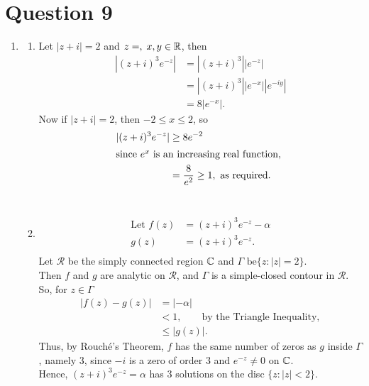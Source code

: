 \section{Question 9}
\begin{enumerate}[label=(\alph*)]
    \item 
    \begin{enumerate}[label=(\roman*)]
        \item 
        Let $ |z+i| = 2 $ and $ z = , \; x, y \in \mathbb{R} $, then
        \begin{align*}
            |(z+i)^3 e^{-z}| &= |(z+i)^3| |e^{-z}| \\
            &= |(z+i)^3| |e^{-x}|| e^{-iy} | \\
            &= 8|e^{-x}|.
        \end{align*}
        Now if $ |z+i| = 2 $, then $ -2 \leq x \leq 2 $, so
        \begin{align*}
            | (z+i)^3 e^{-z} | &\geq 8e^{-2} \\
            \intertext{since $e^x$ is an increasing real function, }
            &= \frac{8}{e^2} \geq 1, \text{ as required}.
        \end{align*}
        \leavevmode \vvs \\
        \item 
        \begin{align*}
    \text{Let }
    f(z) &= (z+i)^3 e^{-z} - \alpha \\
    g(z) &= (z+i)^3 e^{-z}. \\
\end{align*}
Let $ \mathcal{R} $ be the simply connected region $\mathbb{C}$ and $ \Gamma \text{ be} \{z: |z| = 2 \} $. 
\vs \\
Then $f$ and $g$ are analytic on $ \mathcal{R} $, and $ \Gamma $ is a simple-closed contour in $ \mathcal{R} $.
\vs \\
So, for $ z \in \Gamma $
\begin{align*}
    | f(z) - g(z) | &= |-\alpha| \\
    &< 1, \qquad \text{by the Triangle Inequality}, \\
    &\leq |g(z)|.
\end{align*}
Thus, by Rouché's Theorem, $f$ has the same number of zeros as $g$ inside $\Gamma$, namely $3$, since $-i$ is a zero of order 3 and $ e^{-z} \neq 0 $ on $\mathbb{C}$. 
\vs \\
Hence, $ (z+i)^3 e^{-z} = \alpha $ has 3 solutions on the disc $ \{z: |z| < 2 \} $.
    \leavevmode \vvs \\

\end{enumerate}
\end{enumerate}
